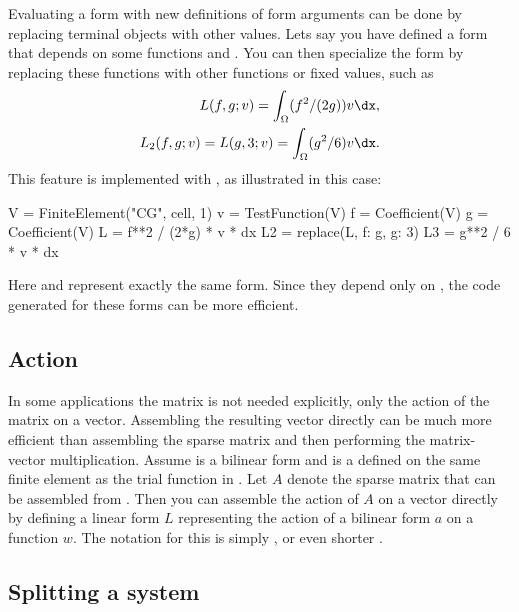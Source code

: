 Evaluating a form with new definitions of form arguments can be done
by replacing terminal objects with other values.  Lets say you have
defined a form  that depends on some functions  and
.  You can then specialize the form by replacing these
functions with other functions or fixed values, such as
\begin{align}
L(f, g; v) = \int_\Omega (f^2 / (2g)) v \dx, \\
L_2(f, g; v) = L(g, 3; v) = \int_\Omega (g^2 / 6) v \dx.
\end{align}
This feature is implemented with , as illustrated in this case:
\begin{python}
V = FiniteElement("CG", cell, 1)
v = TestFunction(V)
f = Coefficient(V)
g = Coefficient(V)
L = f**2 / (2*g) * v * dx
L2 = replace(L, { f: g, g: 3})
L3 = g**2 / 6 * v * dx
\end{python}
Here  and  represent exactly the same form. Since
they depend only on , the code generated for these forms can
be more efficient.

\subsection{Action}
\label{ufl:sec:action}
In some applications the matrix is not needed explicitly, only the
action of the matrix on a vector. Assembling the resulting vector
directly can be much more efficient than assembling the sparse matrix
and then performing the matrix-vector multiplication.
Assume  is a bilinear form and 
is a  defined on the same finite
element as the trial function in .
Let $A$ denote the sparse matrix that can be assembled
from . Then you can assemble the action of
$A$ on a vector directly by defining a linear form $L$
representing the action of a bilinear form $a$ on a function $w$.
The notation for this is simply ,
or even shorter .


\subsection{Splitting a system}
\label{ufl:sec:system}

